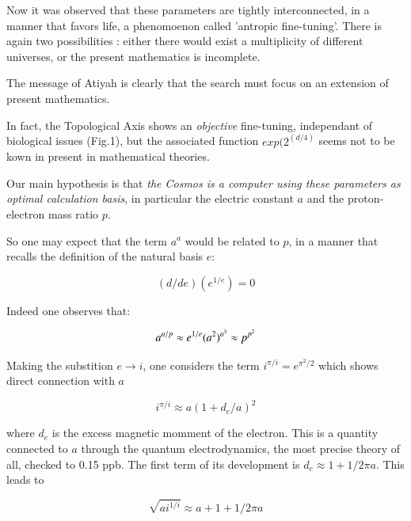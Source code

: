 \documentclass[a4paper,9pt]{article}
\begin{document}
         
         Now it was observed that these parameters are tightly interconnected, in a manner that favors life, a phenomoenon called 'antropic fine-tuning'. There is again two possibilities : either there would exist a multiplicity of different universes, or the present mathematics is incomplete.
         
         
         The message of Atiyah is clearly that the search must focus on an extension of present mathematics.
         
         
         In fact, the Topological Axis shows an \textit {objective} fine-tuning, independant of biological issues (Fig.1), but the associated function $exp(2^(d/4)$ seems not to be kown in present in mathematical theories.
   
         
         
         Our main hypothesis is that \textit {the Cosmos is a computer using these parameters as optimal calculation basis},
         in particular the electric constant $a$ and the proton-electron mass ratio $p$.
         
         
        So one may expect that the term $a^a$ would be related to $p$, in a manner that recalls the definition of the natural basis $e$:
         
  \begin{equation}
 (d/de)(e^{1/e}) = 0 
\end{equation}

   Indeed one observes that:
   
   \begin{equation}
 a^{a/p} \approx e^{1/e} \\
 (a^2)^{a^3} \approx p^{p^2}
\end{equation}

Making the substition $e \to i$, one considers the term $i^{\pi/i} = e^{\pi^2/2}$ which shows direct connection with $a$
   
 \begin{equation}
i^{\pi/i} \approx a(1+d_e/a)^2 
\end{equation}
 
where $d_e$ is the excess magnetic momment of the electron. This is a quantity connected to $a$ through the quantum electrodynamics, the most precise theory of all, checked to 0.15 ppb. The first term of its development is $d_e \approx 1 + 1/2\pi a$. This leads to

\begin{equation}
\sqrt {a i^{1/i}} \approx a + 1 + 1/ 2\pi a
\end{equation}
\end{document}
